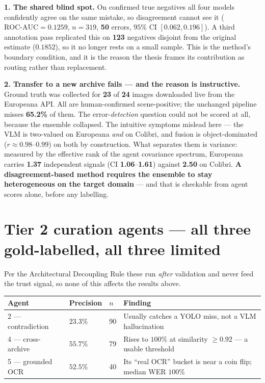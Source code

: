 \documentclass[10pt,a4paper]{article}
\newcommand{\num}[1]{\textbf{#1}}
\begin{document}
\textbf{1. The shared blind spot.} On confirmed true negatives all four models confidently agree on the same mistake, so disagreement cannot see it ($\text{ROC-AUC}=0.1259$, $n=319$, \num{50} errors, $95\%$ CI $[0.062,0.196]$). A third annotation pass replicated this on \num{123} negatives disjoint from the original estimate ($0.1852$), so it no longer rests on a small sample. This is the method's boundary condition, and it is the reason the thesis frames its contribution as routing rather than replacement.

\medskip
\textbf{2. Transfer to a new archive fails --- and the reason is instructive.} Ground truth was collected for \num{23} of \num{24} images downloaded live from the Europeana API. All are human-confirmed scene-positive; the unchanged pipeline misses \num{65.2\%} of them. The error-\emph{detection} question could not be scored at all, because the ensemble collapsed. The intuitive symptoms mislead here --- the VLM is two-valued on Europeana \emph{and} on Colibri, and fusion is object-dominated ($r\approx0.98$--$0.99$) on both by construction. What separates them is variance: measured by the effective rank of the agent covariance spectrum, Europeana carries \num{1.37} independent signals (CI \num{1.06}--\num{1.61}) against \num{2.50} on Colibri. \textbf{A disagreement-based method requires the ensemble to stay heterogeneous on the target domain} --- and that is checkable from agent scores alone, before any labelling.

\section{Tier 2 curation agents --- all three gold-labelled, all three limited}
Per the Architectural Decoupling Rule these run \emph{after} validation and never feed the trust signal, so none of this affects the results above.
\begin{center}\footnotesize
\begin{tabular}{l l l p{7.4cm}}
\toprule
\textbf{Agent} & \textbf{Precision} & \textbf{$n$} & \textbf{Finding} \\
\midrule
2 --- contradiction & $23.3\%$ & 90 & Usually catches a YOLO miss, not a VLM hallucination \\
4 --- cross-archive & $55.7\%$ & 79 & Rises to $100\%$ at similarity $\ge 0.92$ --- a usable threshold \\
5 --- grounded OCR & $52.5\%$ & 40 & Its ``real OCR'' bucket is near a coin flip; median WER $100\%$ \\
\bottomrule
\end{tabular}
\end{center}
\end{document}
